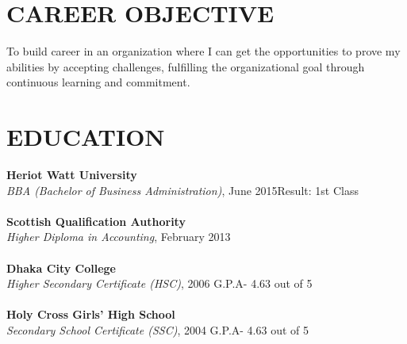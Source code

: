 \documentclass[margin]{res}
\begin{document}
\begin{resume}
%
\section{CAREER OBJECTIVE}
\par
To build career in an organization where I can get the opportunities to prove my abilities by accepting challenges, fulfilling the organizational goal through continuous learning and commitment.




\section{EDUCATION}
\textbf{Heriot Watt University}\\
{\sl BBA (Bachelor of Business Administration)}, June 2015\hfill Result: 
1st Class
\\ \\
\textbf{ Scottish Qualification Authority}\\
{\sl Higher Diploma in Accounting}, February 2013 
\\ \\
\textbf{Dhaka City College}\\
{\sl Higher Secondary Certificate (HSC)}, 2006 \hfill G.P.A- 4.63 out of 5
\\ \\
\textbf{Holy Cross Girls' High School}\\
{\sl Secondary School Certificate (SSC)}, 2004 \hfill G.P.A- 4.63 out of 5




\end{resume}
\end{document}
